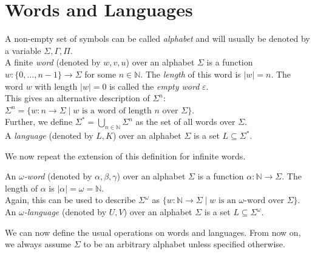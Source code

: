 \section{Words and Languages}
\begin{defn}
	A  non-empty set of symbols can be called \emph{alphabet} and will usually be denoted by a variable $\Sigma, \Gamma, \Pi$. \\
	A finite \emph{word} (denoted by $w, v, u$) over an alphabet $\Sigma$ is a function $w : \{0, \dots, n-1\} \rightarrow \Sigma$ for some $n \in \mathbb{N}$. The \emph{length} of this word is $|w| = n$. The word $w$ with length $|w| = 0$ is called the \emph{empty word} $\varepsilon$. \\
	This gives an alternative description of $\Sigma^n$: $\Sigma^n = \{ w : n \rightarrow \Sigma \mid w \text{ is a word of length } n \text{ over } \Sigma\}$. \\
	Further, we define $\Sigma^* = \bigcup\limits_{n \in \mathbb{N}} \Sigma^n$ as the set of all words over $\Sigma$.\\
	A \emph{language} (denoted by $L, K$) over an alphabet $\Sigma$ is a set $L \subseteq \Sigma^*$.
\end{defn}

\vspace*{10pt}
We now repeat the extension of this definition for infinite words.
\vspace*{10pt}

\begin{defn}
	An \emph{$\omega$-word} (denoted by $\alpha, \beta, \gamma$) over an alphabet $\Sigma$ is a function $\alpha : \mathbb{N} \rightarrow \Sigma$. The length of $\alpha$ is $|\alpha| = \omega = \mathbb{N}$. \\
	Again, this can be used to describe $\Sigma^\omega$ as $\{w : \mathbb{N} \rightarrow \Sigma \mid w \text{ is an } \omega \text{-word over } \Sigma\}$.\\
	An \emph{$\omega$-language} (denoted by $U, V$) over an alphabet $\Sigma$ is a set $L \subseteq \Sigma^\omega$.
\end{defn}

\vspace*{10pt}
We can now define the usual operations on words and languages. From now on, we always assume $\Sigma$ to be an arbitrary alphabet unless specified otherwise.
\vspace*{10pt}

